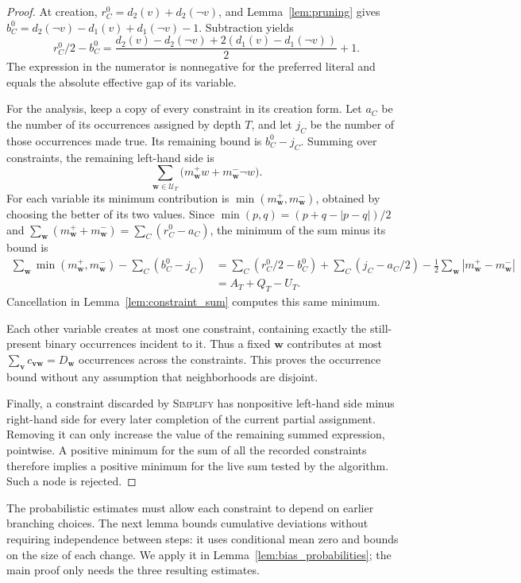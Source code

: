 \documentclass[11pt,a4paper]{article}
\theoremstyle{definition}
\theoremstyle{remark}
\begin{document}
\begin{proof}
At creation, $r_C^0=d_2(v)+d_2(\neg v)$, and Lemma~\ref{lem:pruning} gives
$b_C^0=d_2(\neg v)-d_1(v)+d_1(\neg v)-1$. Subtraction yields
\[
 r_C^0/2-b_C^0
 =\frac{d_2(v)-d_2(\neg v)+2(d_1(v)-d_1(\neg v))}{2}+1.
\]
The expression in the numerator is nonnegative for the preferred literal
and equals the absolute effective gap of its variable.

For the analysis, keep a copy of every constraint in its creation form.
Let $a_C$ be the number of its occurrences assigned by depth $T$, and let
$j_C$ be the number of those occurrences made true. Its remaining bound
is $b_C^0-j_C$. Summing over constraints, the remaining left-hand side is
\[
 \sum_{\mathbf w\in\mathcal U_T}
       \bigl(m_{\mathbf w}^+w+m_{\mathbf w}^-\neg w\bigr).
\]
For each variable its minimum contribution is
$\min(m_{\mathbf w}^+,m_{\mathbf w}^-)$, obtained by choosing the better
of its two values. Since
$\min(p,q)=(p+q-|p-q|)/2$ and
$\sum_{\mathbf w}(m_{\mathbf w}^++m_{\mathbf w}^-)=\sum_C(r_C^0-a_C)$,
the minimum of the sum minus its bound is
\begin{align*}
 \sum_{\mathbf w}\min(m_{\mathbf w}^+,m_{\mathbf w}^-)-\sum_C(b_C^0-j_C)
 &=\sum_C(r_C^0/2-b_C^0)+\sum_C(j_C-a_C/2)
       -\tfrac12\sum_{\mathbf w}|m_{\mathbf w}^+-m_{\mathbf w}^-|\\
 &=A_T+Q_T-U_T.
\end{align*}
Cancellation in Lemma~\ref{lem:constraint_sum} computes this same minimum.

Each other variable creates at most one constraint, containing exactly the
still-present binary occurrences incident to it. Thus a fixed
$\mathbf w$ contributes at most $\sum_{\mathbf v}c_{\mathbf v\mathbf w}
=D_{\mathbf w}$ occurrences across the constraints. This proves the
occurrence bound without any assumption that neighborhoods are disjoint.

Finally, a constraint discarded by \textnormal{\textsc{Simplify}} has nonpositive
left-hand side minus right-hand side for every later completion of the
current partial assignment. Removing it can only increase the value of
the remaining summed expression, pointwise. A positive minimum for the
sum of all the recorded constraints therefore implies a positive minimum
for the live sum tested by the algorithm. Such a node is rejected.
\end{proof}

The probabilistic estimates must allow each constraint to depend on earlier
branching choices. The next lemma bounds cumulative deviations without
requiring independence between steps: it uses conditional mean zero and
bounds on the size of each change. We apply it in
Lemma~\ref{lem:bias_probabilities}; the main proof only needs the three
resulting estimates.
\end{document}
